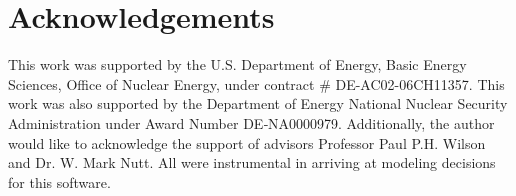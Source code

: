 \section{Acknowledgements}
This work was supported by the U.S.  Department of Energy, Basic Energy
Sciences, Office of Nuclear Energy, under contract \# DE-AC02-06CH11357.  This
work was also supported by the Department of Energy National Nuclear Security
Administration under Award Number DE‐NA0000979. Additionally, the author would
like to acknowledge the support of advisors Professor Paul P.H. Wilson and Dr.
W. Mark Nutt. All were instrumental in arriving at 
modeling decisions for this software.
